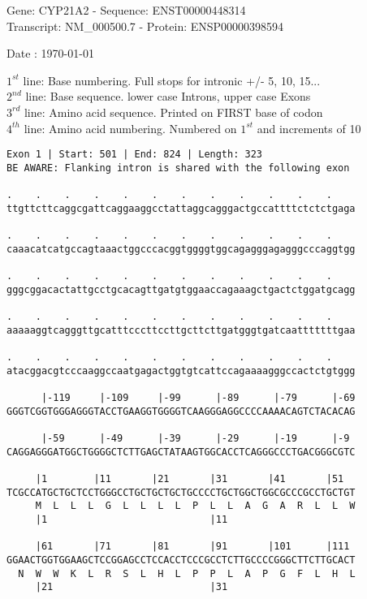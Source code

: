 \documentclass{article}
\begin{document}
\begin{center}
\begin{large}
Gene: CYP21A2 - Sequence: ENST00000448314\\
Transcript: NM\_000500.7 - Protein: ENSP00000398594
 
 Date : \today
\end{large}
\end{center}
$1^{st}$ line: Base numbering. Full stops for intronic +/- 5, 10, 15...\\
$2^{nd}$ line: Base sequence. lower case Introns, upper case Exons\\
$3^{rd}$ line: Amino acid sequence. Printed on FIRST base of codon\\
$4^{th}$ line: Amino acid numbering. Numbered on $1^{st}$ and increments of 10\\
\begin{Verbatim}
Exon 1 | Start: 501 | End: 824 | Length: 323
BE AWARE: Flanking intron is shared with the following exon
 
.    .    .    .    .    .    .    .    .    .    .    .    
ttgttcttcaggcgattcaggaaggcctattaggcagggactgccattttctctctgaga
  
.    .    .    .    .    .    .    .    .    .    .    .    
caaacatcatgccagtaaactggcccacggtggggtggcagagggagagggcccaggtgg
  
.    .    .    .    .    .    .    .    .    .    .    .    
gggcggacactattgcctgcacagttgatgtggaaccagaaagctgactctggatgcagg
  
.    .    .    .    .    .    .    .    .    .    .    .    
aaaaaggtcagggttgcatttcccttccttgcttcttgatgggtgatcaatttttttgaa
  
.    .    .    .    .    .    .    .    .    .    .    .    
atacggacgtcccaaggccaatgagactggtgtcattccagaaaagggccactctgtggg
  
      |-119     |-109     |-99      |-89      |-79      |-69
GGGTCGGTGGGAGGGTACCTGAAGGTGGGGTCAAGGGAGGCCCCAAAACAGTCTACACAG
  
      |-59      |-49      |-39      |-29      |-19      |-9 
CAGGAGGGATGGCTGGGGCTCTTGAGCTATAAGTGGCACCTCAGGGCCCTGACGGGCGTC
  
     |1        |11       |21       |31       |41       |51  
TCGCCATGCTGCTCCTGGGCCTGCTGCTGCTGCCCCTGCTGGCTGGCGCCCGCCTGCTGT
     M  L  L  L  G  L  L  L  L  P  L  L  A  G  A  R  L  L  W
     |1                            |11                      
  
     |61       |71       |81       |91       |101      |111 
GGAACTGGTGGAAGCTCCGGAGCCTCCACCTCCCGCCTCTTGCCCCGGGCTTCTTGCACT
  N  W  W  K  L  R  S  L  H  L  P  P  L  A  P  G  F  L  H  L
     |21                           |31                      
  

\end{Verbatim}
\end{document}
